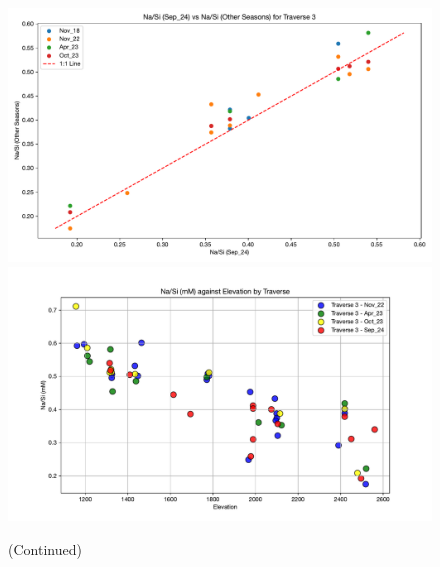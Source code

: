 \begin{figure}[p]\ContinuedFloat
    \centering
    \includegraphics[width=\textwidth]{Na_Si_Trav3.pdf}
    \includegraphics[width=\textwidth]{Na_Si_Elevation.pdf}
    \caption[]{(Continued)}
\end{figure}

\FloatBarrier






